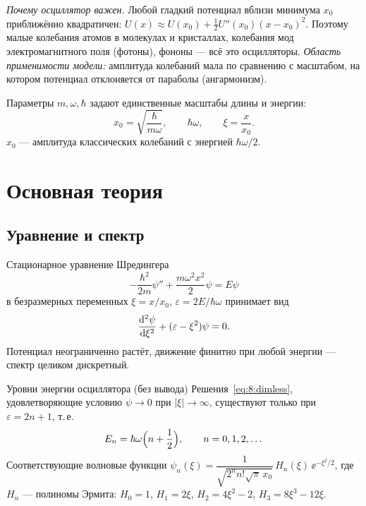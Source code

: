 \emph{Почему осциллятор важен.} Любой гладкий потенциал вблизи минимума $x_0$ приближённо
квадратичен: $U(x)\approx U(x_0)+\frac12U''(x_0)(x-x_0)^2$. Поэтому малые колебания атомов в
молекулах и кристаллах, колебания мод электромагнитного поля (фотоны), фононы — всё это
осцилляторы. \emph{Область применимости модели:} амплитуда колебаний мала по сравнению с масштабом,
на котором потенциал отклоняется от параболы (ангармонизм).

\begin{definition}
Параметры $m,\omega,\hbar$ задают единственные масштабы длины и энергии:
\begin{equation}\label{eq:8:scales}
  x_0=\sqrt{\frac{\hbar}{m\omega}},\qquad \hbar\omega,\qquad \xi=\frac{x}{x_0}.
\end{equation}
$x_0$ — амплитуда классических колебаний с энергией $\hbar\omega/2$.
\end{definition}

\section{Основная теория}

\subsection{Уравнение и спектр}

Стационарное уравнение Шредингера
\begin{equation}\label{eq:8:sse}
  -\frac{\hbar^2}{2m}\psi''+\frac{m\omega^2x^2}{2}\psi=E\psi
\end{equation}
в безразмерных переменных $\xi=x/x_0$, $\varepsilon=2E/\hbar\omega$ принимает вид
\begin{equation}\label{eq:8:dimless}
  \frac{\mathrm{d} ^2\psi}{\mathrm{d} \xi^2}+(\varepsilon-\xi^2)\psi=0 .
\end{equation}
Потенциал неограниченно растёт, движение финитно при любой энергии — спектр целиком дискретный.

\begin{principle}{Уровни энергии осциллятора (без вывода)}
Решения~\eqref{eq:8:dimless}, удовлетворяющие условию $\psi\to0$ при $|\xi|\to\infty$, существуют
только при $\varepsilon=2n+1$, т.\,е.
\begin{equation}\label{eq:8:En}
  E_n=\hbar\omega\Bigl(n+\frac12\Bigr),\qquad n=0,1,2,\dots
\end{equation}
Соответствующие волновые функции
$\psi_n(\xi)=\dfrac{1}{\sqrt{2^nn!\sqrt\pi\,x_0}}\,H_n(\xi)\,\ee^{-\xi^2/2}$,
где $H_n$ — полиномы Эрмита: $H_0=1$, $H_1=2\xi$, $H_2=4\xi^2-2$, $H_3=8\xi^3-12\xi$.
\end{principle}

